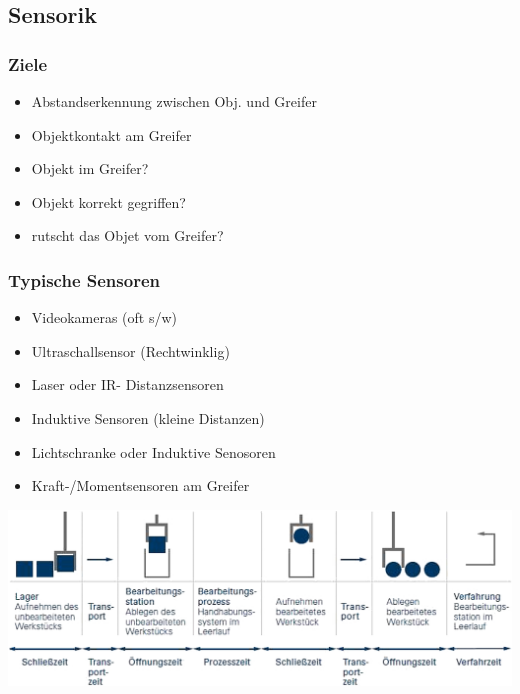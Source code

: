 \subsection{Sensorik}
\begin{minipage}{0.5\linewidth}
    \subsubsection{Ziele}
   \begin{itemize}
       \item Abstandserkennung zwischen Obj. und Greifer
       \item Objektkontakt am Greifer
       \item Objekt im Greifer?
       \item Objekt korrekt gegriffen?
       \item rutscht das Objet vom Greifer?
   \end{itemize}
\end{minipage}
\begin{minipage}{0.5\linewidth}
    \subsubsection{Typische Sensoren}
    \begin{itemize}
        \item Videokameras (oft s/w)
        \item Ultraschallsensor (Rechtwinklig)
        \item Laser oder IR- Distanzsensoren
        \item Induktive Sensoren (kleine Distanzen)
        \item Lichtschranke oder Induktive Senosoren
        \item Kraft-/Momentsensoren am Greifer
    \end{itemize}
\end{minipage}
 \includegraphics[width=\linewidth]{./bilder/GreiferZyklus}
 
